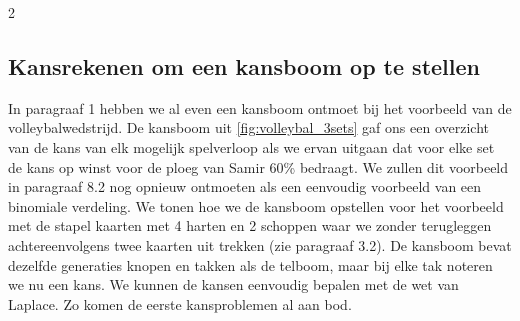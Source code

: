 \begin{multicols}{2}
\subsection*{Kansrekenen om een kansboom op te stellen}
In paragraaf 1 hebben we al even een kansboom ontmoet bij het voorbeeld van de volleybalwedstrijd. De kansboom uit \autoref{fig:volleybal_3sets}  gaf ons een overzicht van de kans van elk mogelijk spelverloop als we ervan uitgaan dat voor elke set de kans op winst voor de ploeg van Samir 60\% bedraagt. We zullen dit voorbeeld in paragraaf 8.2 nog opnieuw ontmoeten als een eenvoudig voorbeeld van een binomiale verdeling.
We tonen hoe we de kansboom opstellen voor het voorbeeld met de stapel kaarten met 4 harten en 2 schoppen waar we zonder terugleggen achtereenvolgens twee kaarten uit trekken (zie paragraaf 3.2). De kansboom bevat dezelfde generaties knopen en takken als de telboom, maar bij elke tak noteren we nu een kans. We kunnen de kansen eenvoudig bepalen met de wet van Laplace.
Zo komen de eerste kansproblemen al aan bod. 

\end{multicols}
